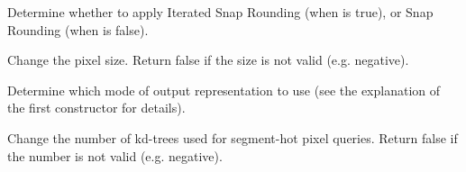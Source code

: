 {Determine whether to apply Iterated Snap Rounding (when  is true),
or Snap Rounding (when  is false).}

{Change the pixel size.
Return false if the size is not valid (e.g. negative). }

{Determine which mode of output representation to use (see the explanation of
the first constructor for details).}

{Change the number of kd-trees used for segment-hot pixel queries.
Return false if the number is not valid (e.g. negative). }



